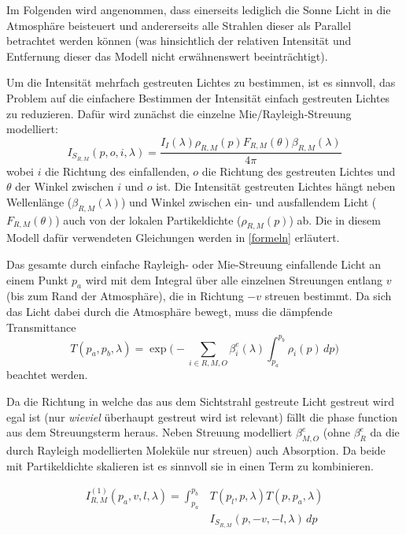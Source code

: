 Im Folgenden wird angenommen, dass einerseits lediglich die Sonne Licht in die Atmosphäre beisteuert und andererseits
alle Strahlen dieser als Parallel betrachtet werden können (was hinsichtlich der relativen Intensität und Entfernung
dieser das Modell nicht erwähnenswert beeinträchtigt).

Um die Intensität mehrfach gestreuten Lichtes zu bestimmen, ist es sinnvoll, das Problem auf die einfachere Bestimmen
der Intensität einfach gestreuten Lichtes zu reduzieren. Dafür wird zunächst die einzelne Mie/Rayleigh-Streuung
modelliert:
\begin{equation}
	I_{S_{R,M}}(p, o, i, \lambda) = \frac{I_I(\lambda)\rho_{R,M}(p)F_{R,M}(\theta)\beta_{R,M}(\lambda)}{4\pi}
\end{equation}
wobei $i$ die Richtung des einfallenden, $o$ die Richtung des gestreuten Lichtes und $\theta$ der Winkel zwischen $i$
und $o$ ist. Die Intensität gestreuten Lichtes hängt neben Wellenlänge ($\beta_{R,M}(\lambda)$) und Winkel zwischen ein-
und ausfallendem Licht ($F_{R,M}(\theta)$) auch von der lokalen Partikeldichte ($\rho_{R,M}(p)$) ab. Die in diesem
Modell dafür verwendeten Gleichungen werden in \cref{formeln} erläutert.

Das gesamte durch einfache Rayleigh- oder Mie-Streuung einfallende Licht an einem Punkt $p_a$ wird mit dem Integral über
alle einzelnen Streuungen entlang $v$ (bis zum Rand der Atmosphäre), die in Richtung $-v$ streuen bestimmt. Da sich das
Licht dabei durch die Atmosphäre bewegt, muss die dämpfende Transmittance
\begin{equation}
	T(p_a, p_b, \lambda) = \exp\bigg(-\sum_{i\in R,M,O}^{} \beta^e_i(\lambda) \int_{p_a}^{p_b} \rho_i(p) \,dp\bigg)
\end{equation}
beachtet werden.

Da die Richtung in welche das aus dem Sichtstrahl gestreute Licht gestreut wird egal ist (nur \textit{wieviel} überhaupt
gestreut wird ist relevant) fällt die phase function aus dem Streuungsterm heraus. Neben Streuung modelliert
$\beta^e_{M,O}$ (ohne $\beta^e_R$ da die durch Rayleigh modellierten Moleküle nur streuen) auch Absorption. Da beide
mit Partikeldichte skalieren ist es sinnvoll sie in einen Term zu kombinieren.

\begin{equation}\label{eq:ss}
	\begin{aligned}
		I^{(1)}_{R,M}(p_a,v,l,\lambda) = \int_{p_a}^{p_b} &T(p_l, p, \lambda)T(p, p_a, \lambda) \\
		&I_{S_{R,M}}(p, -v, -l, \lambda) \,dp\\
	\end{aligned}
\end{equation}


